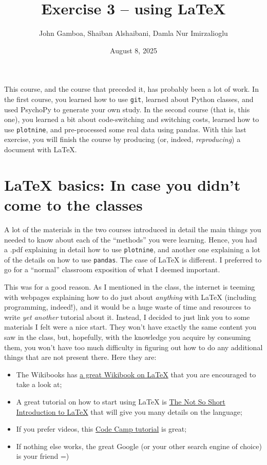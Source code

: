 \documentclass[11pt,a4paper]{scrartcl}
\title{\textbf{Exercise 3 – using \LaTeX}}
\author{John Gamboa, Shaiban Alshaibani, Damla Nur Imirzalioglu}
\date{August 8, 2025}
\begin{document}
\maketitle
This course, and the course that preceded it, has probably been a lot of work. In the first course, you learned how to use \texttt{git}, learned about Python classes, and used
PsychoPy to generate your own study. In the second course (that is, this one), you
learned a bit about code-switching and switching costs, learned how to use \texttt{plotnine},
and pre-processed some real data using pandas. With this last exercise, you will finish
the course by producing (or, indeed, \textit{reproducing}) a document with \LaTeX.

\section{LaTeX basics: In case you didn’t come to the classes}
A lot of the materials in the two courses introduced in detail the main things you needed
to know about each of the “methods” you were learning. Hence, you had a .pdf explaining
in detail how to use \texttt{plotnine}, and another one explaining a lot of the details on how to
use \texttt{pandas}. The case of LaTeX is different. I preferred to go for a “normal” classroom
exposition of what I deemed important.

This was for a good reason. As I mentioned in the class, the internet is teeming with
webpages explaining how to do just about \textit{anything} with LaTeX (including programming,
indeed!), and it would be a huge waste of time and resources to write \textit{yet another} tutorial
about it. Instead, I decided to just link you to some materials I felt were a nice start.
They won’t have exactly the same content you saw in the class, but, hopefully, with
the knowledge you acquire by consuming them, you won’t have too much difficulty in
figuring out how to do any additional things that are not present there. Here they are:


\begin{itemize}
    \item The Wikibooks has \href{https://en.wikibooks.org/wiki/LaTeX}{a great Wikibook on LaTeX} that you are encouraged to take a look at;
    \item A great tutorial on how to start using LaTeX is \href{https://ctan.kako-dev.de/info/lshort/english/lshort.pdf}{The Not So Short Introduction to LaTeX} that will give you many details on the language;
    \item If you prefer videos, this \href{https://www.youtube.com/watch?v=ydOTMQC7np0}{Code Camp tutorial} is great;
    \item If nothing else works, the great Google (or your other search engine of choice) is your friend =)
\end{itemize}
\end{document}
